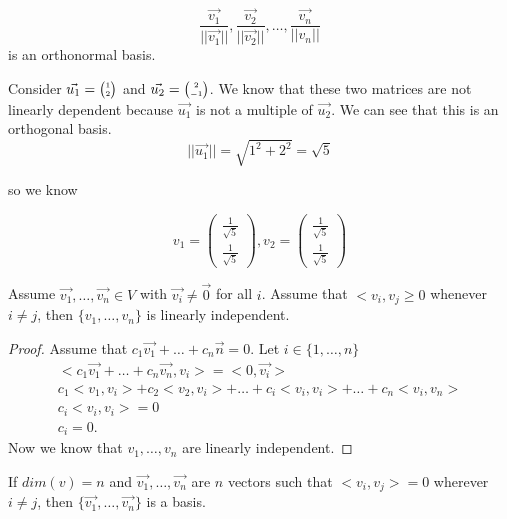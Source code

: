   \begin{equation}
    \frac{\vec{v_1}}{| |\vec{v_1}| |},\frac{\vec{v_2}}{| | \vec{v_2} | |},\ldots,\frac{\vec{v_n}}{| | v_n | |}
  \end{equation}
  is an orthonormal basis.

  \begin{problem}
    Consider $\vec{u_1}=\SmallMatrix{1\\2}$ and $\vec{u_2}=\SmallMatrix{2\\-1}$. We know that these two matrices are not linearly dependent because $\vec{u_1}$ is not a multiple of $\vec{u_2}$. We can see that this is an orthogonal basis.
    \begin{equation}
      | | \vec{u_1} | | = \sqrt{1^2+2^2} =\sqrt{5} 
    \end{equation}

    so we know

    \begin{equation}
      v_1=\begin{pmatrix} \frac{1}{\sqrt{5} }\\\frac{1}{\sqrt{5} } \end{pmatrix} ,v_2=\begin{pmatrix} \frac{1}{\sqrt{5} }\\\frac{1}{\sqrt{5} } \end{pmatrix} 
    \end{equation}
  \end{problem}

  \begin{proposition}
    Assume $\vec{v_1},\ldots,\vec{v_n}\in V$ with $\vec{v_i}\neq \vec{0}$ for all $i$. Assume that $<v_i,v_j\ge 0$ whenever $i\neq j$, then $\{v_1,\ldots,v_n\}$ is linearly independent.
    \begin{proof}
      Assume that $c_1\vec{v_1}+\ldots+c_n\vec{n}=0$. Let $i\in\{1,\ldots,n\}$
      \begin{align*}
        <c_1\vec{v_1}+\ldots+c_n \vec{v_n}, v_i> = <0,\vec{v_i}>\\
        c_1<v_1,v_i> + c_2<v_2,v_i>+\ldots+ c_i<v_i,v_i>+\ldots+c_n<v_i,v_n>\\
        c_i<v_i,v_i> = 0\\
        c_i = 0
      .\end{align*}
      Now we know that $v_1,\ldots,v_n$ are linearly independent.
    \end{proof}
  \end{proposition}

  \begin{corollary}
    If $dim(v)=n$ and $\vec{v_1},\ldots,\vec{v_n}$ are $n$ vectors such that $<v_i,v_j> = 0$ wherever $i\neq j$, then $\{\vec{v_1},\ldots,\vec{v_n}\}$ is a basis.
  \end{corollary}


